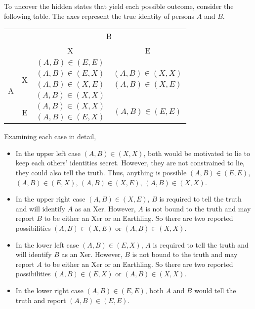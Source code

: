 \documentclass[12pt,twoside]{article}
\begin{document}
\begin{problems}
\begin{problemparts}
\problempart %

To uncover the hidden states that yield each possible outcome, consider the
following table. The axes represent the true identity of persons $A$ and $B$.

\begin{center}
    \begin{tabular}{c c|c c}
        & & \multicolumn{2}{c}{B} \\
        & & X & E \\
        \hline 
        \multirow{6}{*}{A} & \multirow{4}{*}{X} & $(A, B) \in (E, E)$ & \\
        &  & $(A, B) \in (E, X)$ & $(A, B) \in (X, X)$ \\
        & & $(A, B) \in (X, E)$ & $(A, B) \in (X, E)$ \\
        & & $(A, B) \in (X, X)$ & \\
        & \multirow{2}{*}{E} & $(A, B) \in (X, X)$ & \multirow{2}{*}{$(A, B) \in (E, E)$} \\
        & & $(A, B) \in (E, X)$ & \\
    \end{tabular}
\end{center}

Examining each case in detail,
\begin{itemize}
    \item  In the upper left case $(A, B) \in (X, X)$, both would be motivated 
    to lie to keep each others' identities secret. However, they are not
    constrained to lie, they could also tell the truth. Thus, anything is 
    possible $(A, B) \in (E, E)$, $(A, B) \in (E, X)$, $(A, B) \in (X, E)$, 
    $(A, B) \in (X, X)$.
    \item In the upper right case $(A, B) \in (X, E)$, $B$ is required to tell 
    the truth and will identify $A$ as an Xer. However, $A$ is not bound to the
    truth and may report $B$ to be either an Xer or an Earthling. So there are
    two reported possibilities $(A, B) \in (X, E)$ or $(A, B) \in (X, X)$.
    \item In the lower left case $(A, B) \in (E, X)$, $A$ is required to tell
    the truth and will identify $B$ as an Xer. However, $B$ is not bound to the
    truth and may report $A$ to be either an Xer or an Earthling. So there are
    two reported possibilities $(A, B) \in (E, X)$ or $(A, B) \in (X, X)$.
    \item In the lower right case $(A, B) \in (E, E)$, both $A$ and $B$ would
    tell the truth and report $(A, B) \in (E, E)$.
\end{itemize}


\end{problemparts}
\end{problems}
\end{document}

